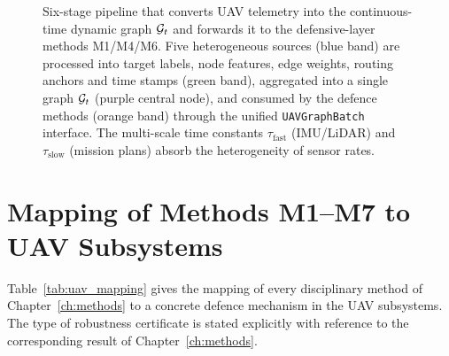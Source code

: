 \begin{figure}[H]
\caption{Six-stage pipeline that converts UAV telemetry into the
continuous-time dynamic graph $\mathcal{G}_t$ and forwards it to the
defensive-layer methods \textsf{M1}/\textsf{M4}/\textsf{M6}. Five
heterogeneous sources (blue band) are processed into target labels,
node features, edge weights, routing anchors and time stamps (green
band), aggregated into a single graph $\mathcal{G}_t$ (purple central
node), and consumed by the defence methods (orange band) through
the unified \texttt{UAVGraphBatch} interface. The multi-scale time
constants $\tau_{\mathrm{fast}}$ (IMU/LiDAR) and
$\tau_{\mathrm{slow}}$ (mission plans) absorb the heterogeneity of
sensor rates.}
\label{fig:uav_telemetry_pipeline}
\end{figure}


\section{Mapping of Methods \textsf{M1}--\textsf{M7} to UAV Subsystems}
\label{sec:uav_mapping}

Table~\ref{tab:uav_mapping} gives the mapping of every disciplinary
method of Chapter~\ref{ch:methods} to a concrete defence mechanism in
the UAV subsystems. The type of robustness certificate is stated
explicitly with reference to the corresponding result of
Chapter~\ref{ch:methods}.


